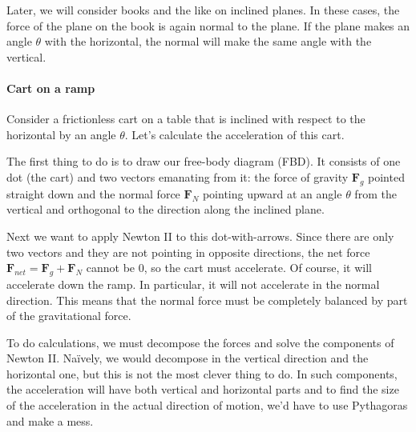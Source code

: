 
Later, we will consider books and the like on inclined planes. In these cases, the force of the plane on the book is again normal to the plane. If the plane makes an angle $θ$ with the horizontal, the normal will make the same angle with the vertical.

\paragraph{Cart on a ramp}


Consider a frictionless cart on a table that is inclined with respect to the horizontal by an angle $θ$. Let's calculate the acceleration of this cart. 

The first thing to do is to draw our free-body diagram (FBD). It consists of one dot (the cart) and two vectors emanating from it: the force of gravity $𝐅_g$ pointed straight down and the normal force $𝐅_N$ pointing upward at an angle $θ$ from the vertical and orthogonal to the direction along the inclined plane. 

Next we want to apply Newton II to this dot-with-arrows. Since there are only two vectors and they are not pointing in opposite directions, the net force $𝐅_{net}= 𝐅_g + 𝐅_N$ cannot be 0, so the cart must accelerate. Of course, it will accelerate down the ramp. In particular, it will not accelerate in the normal direction. This means that the normal force must be completely balanced by part of the gravitational force. 

To do calculations, we must decompose the forces and solve the components of Newton II. Naïvely, we would decompose in the vertical direction and the horizontal one, but this is not the most clever thing to do. In such components, the acceleration will have both vertical and horizontal parts and to find the size of the acceleration in the actual direction of motion, we'd have to use Pythagoras and make a mess. 


